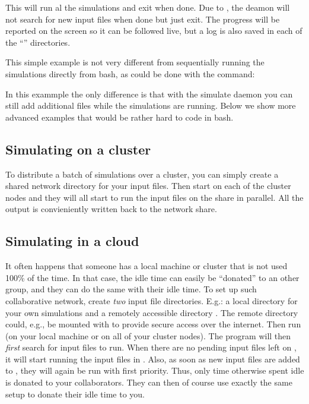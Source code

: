 This will run al the simulations and exit when done. Due to , the deamon will not search for new input files when done but just exit. The progress will be reported on the screen so it can be followed live, but a log is also saved in each of the ``'' directories.

This simple example is not very different from sequentially running the simulations directly from bash, as could be done with the command:


In this exammple the only difference is that with the simulate daemon you can still add additional files while the simulations are running. Below we show more advanced examples that would be rather hard to code in bash.

\subsection{Simulating on a cluster}

To distribute a batch of simulations over a cluster, you can simply create a shared network directory for your input files. Then start \prog {} \emph{} on each of the cluster nodes
and they will all start to run the input files on the share in parallel. All the output is convieniently written back to the network share.

\subsection{Simulating in a cloud}

It often happens that someone has a local machine or cluster that is not used 100\% of the time. In that case, the idle time can easily be ``donated'' to an other group, and they can do the same with their idle time. To set up such collaborative network, create \emph{two} input file directories. E.g.: a local directory  for your own simulations and a remotely accessible directory . The remote directory could, e.g., be mounted with  to provide secure access over the internet. Then run \prog {} (on your local machine or on all of your cluster nodes). The program will then \emph{first} search  for input files to run. When there are no pending input files left on , it will start running the input files in . Also, as soon as new input files are added to , they will again be run with first priority. Thus, only time otherwise spent idle is donated to your collaborators. They can then of course use exactly the same setup to donate their idle time to you.